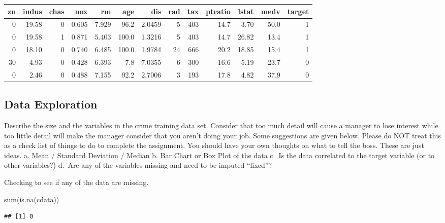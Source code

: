 \documentclass[
]{article}
\newenvironment{Shaded}{\begin{snugshade}}{\end{snugshade}}
\newcommand{\FunctionTok}[1]{\textcolor[rgb]{0.00,0.00,0.00}{#1}}
\newcommand{\NormalTok}[1]{#1}
\begin{document}
\begin{table}[H]
\centering
\begin{tabular}[t]{r|r|r|r|r|r|r|r|r|r|r|r|r}
\hline
zn & indus & chas & nox & rm & age & dis & rad & tax & ptratio & lstat & medv & target\\
\hline
0 & 19.58 & 0 & 0.605 & 7.929 & 96.2 & 2.0459 & 5 & 403 & 14.7 & 3.70 & 50.0 & 1\\
\hline
0 & 19.58 & 1 & 0.871 & 5.403 & 100.0 & 1.3216 & 5 & 403 & 14.7 & 26.82 & 13.4 & 1\\
\hline
0 & 18.10 & 0 & 0.740 & 6.485 & 100.0 & 1.9784 & 24 & 666 & 20.2 & 18.85 & 15.4 & 1\\
\hline
30 & 4.93 & 0 & 0.428 & 6.393 & 7.8 & 7.0355 & 6 & 300 & 16.6 & 5.19 & 23.7 & 0\\
\hline
0 & 2.46 & 0 & 0.488 & 7.155 & 92.2 & 2.7006 & 3 & 193 & 17.8 & 4.82 & 37.9 & 0\\
\hline
\end{tabular}
\end{table}

\hypertarget{data-exploration}{%
\subsection{Data Exploration}\label{data-exploration}}

Describe the size and the variables in the crime training data set.
Consider that too much detail will cause a manager to lose interest
while too little detail will make the manager consider that you aren't
doing your job. Some suggestions are given below. Please do NOT treat
this as a check list of things to do to complete the assignment. You
should have your own thoughts on what to tell the boss. These are just
ideas. a. Mean / Standard Deviation / Median b. Bar Chart or Box Plot of
the data c.~Is the data correlated to the target variable (or to other
variables?) d.~Are any of the variables missing and need to be imputed
``fixed''?

Checking to see if any of the data are missing.

\begin{Shaded}
\begin{Highlighting}[]
\FunctionTok{sum}\NormalTok{(}\FunctionTok{is.na}\NormalTok{(cdata))}
\end{Highlighting}
\end{Shaded}

\begin{verbatim}
## [1] 0
\end{verbatim}
\end{document}
